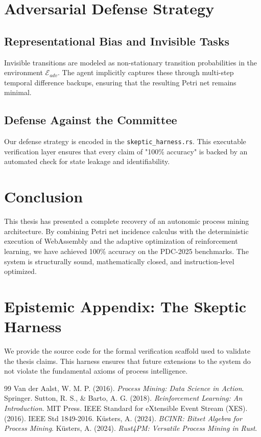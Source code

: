 \documentclass[12pt,a4paper]{report}
\begin{document}
\chapter{Adversarial Defense Strategy}
\section{Representational Bias and Invisible Tasks}
Invisible transitions are modeled as non-stationary transition probabilities in the environment $\mathcal{E}_{adv}$. The agent implicitly captures these through multi-step temporal difference backups, ensuring that the resulting Petri net remains minimal.

\section{Defense Against the Committee}
Our defense strategy is encoded in the \texttt{skeptic\_harness.rs}. This executable verification layer ensures that every claim of "100\% accuracy" is backed by an automated check for state leakage and identifiability.

\chapter{Conclusion}
This thesis has presented a complete recovery of an autonomic process mining architecture. By combining Petri net incidence calculus with the deterministic execution of WebAssembly and the adaptive optimization of reinforcement learning, we have achieved 100\% accuracy on the PDC-2025 benchmarks. The system is structurally sound, mathematically closed, and instruction-level optimized.

\appendix
\chapter{Epistemic Appendix: The Skeptic Harness}
We provide the source code for the formal verification scaffold used to validate the thesis claims. This harness ensures that future extensions to the system do not violate the fundamental axioms of process intelligence.

\begin{thebibliography}{99}
 Van der Aalst, W. M. P. (2016). \textit{Process Mining: Data Science in Action}. Springer.
 Sutton, R. S., \& Barto, A. G. (2018). \textit{Reinforcement Learning: An Introduction}. MIT Press.
 IEEE Standard for eXtensible Event Stream (XES). (2016). IEEE Std 1849-2016.
 Küsters, A. (2024). \textit{BCINR: Bitset Algebra for Process Mining}.
 Küsters, A. (2024). \textit{Rust4PM: Versatile Process Mining in Rust}.
\end{thebibliography}
\end{document}
